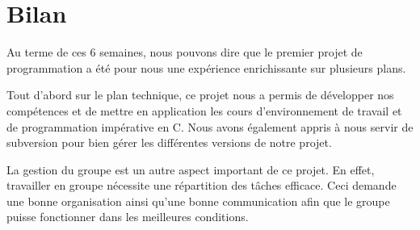 \documentclass[10pt,a4paper]{article}
\begin{document}
\newpage
\section{Bilan}
Au terme de ces 6 semaines, nous pouvons dire que le premier projet de programmation a été pour nous une expérience enrichissante sur plusieurs plans. 

Tout d'abord sur le plan technique, ce projet nous a permis de développer nos compétences et de mettre en application les cours d'environnement de travail et de programmation impérative en C. Nous avons également appris à nous servir de subversion pour bien gérer les différentes versions de notre projet.  

La gestion du groupe est un autre aspect important de ce projet. En effet, travailler en groupe nécessite une répartition des tâches efficace. Ceci demande une bonne organisation ainsi qu'une bonne communication afin que le groupe puisse fonctionner dans les meilleures conditions. 
\end{document}
